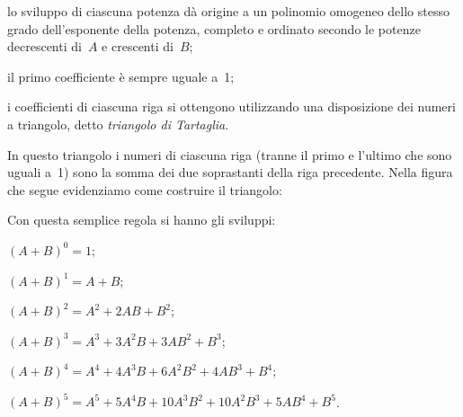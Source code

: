\begin{itemize*}
\item lo sviluppo di ciascuna potenza dà origine a un polinomio
omogeneo dello stesso grado dell'esponente della
potenza, completo e ordinato secondo le potenze decrescenti di~$A$ e crescenti di~$B$;
\item il primo coefficiente è sempre uguale a~1;
\item i coefficienti di ciascuna riga si ottengono utilizzando una
disposizione dei numeri a triangolo, detto \emph{triangolo di Tartaglia}.
\end{itemize*}

\begin{center}

\end{center}

In questo triangolo i numeri di ciascuna riga (tranne il primo e
l'ultimo che sono uguali a~1) sono la somma dei due
soprastanti della riga precedente. Nella figura che segue evidenziamo
come costruire il triangolo:

\begin{center}

\end{center}


Con questa semplice regola si hanno gli sviluppi:

\begin{itemize*}
\item $(A+B)^{0}=1$;
\item $(A+B)^{1}=A+B$;
\item $(A+B)^{2}=A^{2}+2AB+B^{2}$;
\item $(A+B)^{3}=A^{3}+3A^{2}B+3AB^{2}+B^{3}$;
\item $(A+B)^{4}=A^{4}+4A^{3}B+6A^{2}B^{2}+4AB^{3}+B^{4}$;
\item $(A+B)^{5}=A^{5}+5A^{4}B+10A^{3}B^{2}+10A^{2}B^{3}+5AB^{4}+B^{5}$.
\end{itemize*}

\ovalbox{\risolvii \ref{ese:12.28}, \ref{ese:12.29}, \ref{ese:12.30}}
\newpage

\cleardoublepage
